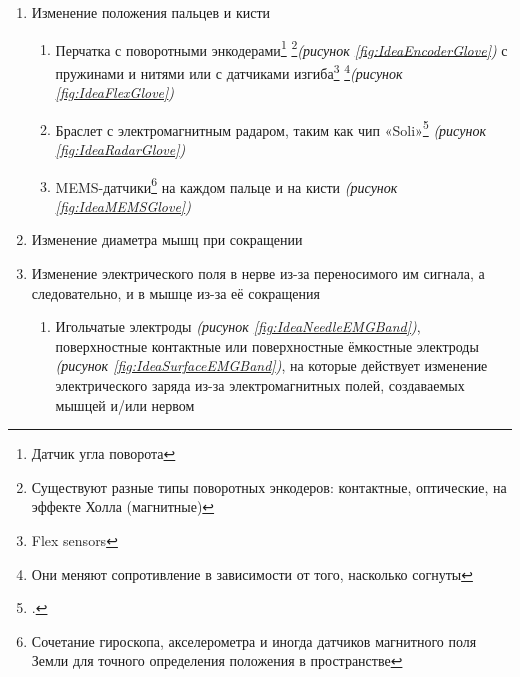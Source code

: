 \documentclass[a4paper, 10pt, final]{article} %
\begin{document}
    \begin{enumerate}[label=\emph{(\arabic*)}]
        \item Изменение положения пальцев и кисти
            \begin{enumerate}[label=\emph{(\alph*)}]
                \item Перчатка с поворотными энкодерами\footnote{Датчик угла поворота} \footnote{Существуют разные типы поворотных энкодеров: контактные, оптические, на эффекте Холла (магнитные)}\emph{(рисунок \ref{fig:IdeaEncoderGlove})} с пружинами и нитями или с датчиками изгиба\footnote{Flex sensors} \footnote{Они меняют сопротивление в зависимости от того, насколько согнуты}\emph{(рисунок \ref{fig:IdeaFlexGlove})}
                \item Браслет с электромагнитным радаром, таким как чип «Soli»\footcite[]{GoogleATAP:Wiki} \emph{(рисунок \ref{fig:IdeaRadarGlove})}
                \item MEMS-датчики\footnote{Сочетание гироскопа, акселерометра и иногда датчиков магнитного поля Земли для точного определения положения в пространстве} на каждом пальце и на кисти \emph{(рисунок \ref{fig:IdeaMEMSGlove})}
            \end{enumerate}
        \item Изменение диаметра мышц при сокращении
        \item Изменение электрического поля в нерве из-за переносимого им сигнала, а следовательно, и в мышце из-за её сокращения \label{ItemDeltaChoice}
            \begin{enumerate}[label=\emph{(\alph*)}]
                \item Игольчатые электроды \emph{(рисунок \ref{fig:IdeaNeedleEMGBand})}, поверхностные контактные или поверхностные ёмкостные электроды \emph{(рисунок \ref{fig:IdeaSurfaceEMGBand})}, на которые действует изменение электрического заряда из-за электромагнитных полей, создаваемых мышцей и/или нервом \label{ItemEMG}
            \end{enumerate}
    \end{enumerate}
\end{document}
